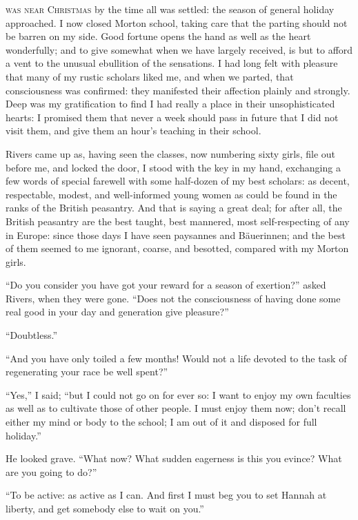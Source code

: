 
 \textsc{was near Christmas} by the time all was settled: the season of general
holiday approached. I now closed Morton school, taking care that the
parting should not be barren on my side. Good fortune opens the hand as
well as the heart wonderfully; and to give somewhat when we have largely
received, is but to afford a vent to the unusual ebullition of the
sensations. I had long felt with pleasure that many of my rustic
scholars liked me, and when we parted, that consciousness was confirmed:
they manifested their affection plainly and strongly. Deep was my
gratification to find I had really a place in their unsophisticated
hearts: I promised them that never a week should pass in future that I
did not visit them, and give them an hour's teaching in their school.

\Mr{} Rivers came up as, having seen the classes, now numbering sixty
girls, file out before me, and locked the door, I stood with the key in
my hand, exchanging a few words of special farewell with some half-dozen
of my best scholars: as decent, respectable, modest, and well-informed
young women as could be found in the ranks of the British peasantry. 
And that is saying a great deal; for after all, the British peasantry
are the best taught, best mannered, most self-respecting of any in
Europe: since those days I have seen paysannes and Bäuerinnen; and the
best of them seemed to me ignorant, coarse, and besotted, compared with
my Morton girls.

\enquote{Do you consider you have got your reward for a season of
exertion?} asked \Mr{} Rivers, when they were gone. \enquote{Does not the
consciousness of having done some real good in your day and generation
give pleasure?}

\enquote{Doubtless.}

\enquote{And you have only toiled a few months! Would not a life
devoted to the task of regenerating your race be well spent?}

\enquote{Yes,} I said; \enquote{but I could not go on for ever so: I
want to enjoy my own faculties as well as to cultivate those of other
people. I must enjoy them now; don't recall either my mind or body to
the school; I am out of it and disposed for full holiday.}

He looked grave. \enquote{What now? What sudden eagerness is this you
evince? What are you going to do?}

\enquote{To be active: as active as I can. And first I must beg you to
set Hannah at liberty, and get somebody else to wait on you.}

